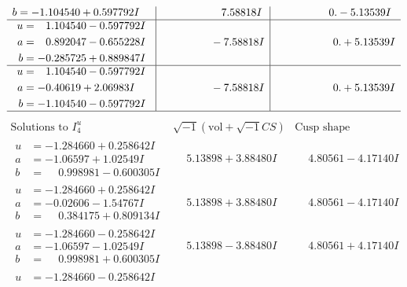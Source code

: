 \documentclass[1p]{elsarticle_modified}
\theoremstyle{definition}
\newcommand{\I}{\sqrt{-1}}
\begin{document}
$$\begin{array}{c|c|c}
\begin{aligned}
b &= -1.104540 + 0.597792 I\end{aligned}
 & \phantom{-0.000000 -}7.58818 I & \phantom{-0.000000 } 0. - 5.13539 I \\ \hline\begin{aligned}
u &= \phantom{-}1.104540 - 0.597792 I \\
a &= \phantom{-}0.892047 - 0.655228 I \\
b &= -0.285725 + 0.889847 I\end{aligned}
 & \phantom{-0.000000 } -7.58818 I & \phantom{-0.000000 -}0. + 5.13539 I \\ \hline\begin{aligned}
u &= \phantom{-}1.104540 - 0.597792 I \\
a &= -0.40619 + 2.06983 I \\
b &= -1.104540 - 0.597792 I\end{aligned}
 & \phantom{-0.000000 } -7.58818 I & \phantom{-0.000000 -}0. + 5.13539 I\\
 \hline 
 \end{array}$$\newpage$$\begin{array}{c|c|c}  
\text{Solutions to }I^u_{4}& \I (\text{vol} + \sqrt{-1}CS) & \text{Cusp shape}\\
 \hline 
\begin{aligned}
u &= -1.284660 + 0.258642 I \\
a &= -1.06597 + 1.02549 I \\
b &= \phantom{-}0.998981 - 0.600305 I\end{aligned}
 & \phantom{-}5.13898 + 3.88480 I & \phantom{-}4.80561 - 4.17140 I \\ \hline\begin{aligned}
u &= -1.284660 + 0.258642 I \\
a &= -0.02606 - 1.54767 I \\
b &= \phantom{-}0.384175 + 0.809134 I\end{aligned}
 & \phantom{-}5.13898 + 3.88480 I & \phantom{-}4.80561 - 4.17140 I \\ \hline\begin{aligned}
u &= -1.284660 - 0.258642 I \\
a &= -1.06597 - 1.02549 I \\
b &= \phantom{-}0.998981 + 0.600305 I\end{aligned}
 & \phantom{-}5.13898 - 3.88480 I & \phantom{-}4.80561 + 4.17140 I \\ \hline\begin{aligned}
u &= -1.284660 - 0.258642 I \\

\end{aligned}
\end{array}$$
\end{document}
